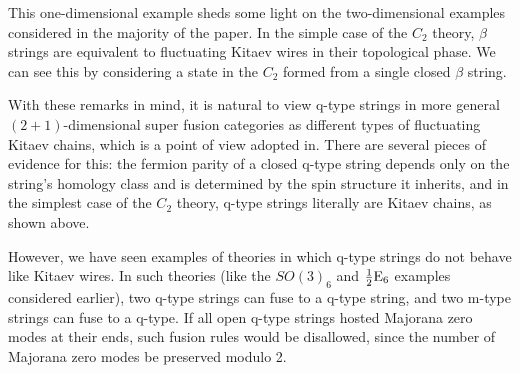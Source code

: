 This one-dimensional example sheds some light on the two-dimensional examples 
considered in the majority of the paper. In the simple case of the $C_2$ theory, 
$\beta$ strings are equivalent to fluctuating Kitaev wires in their topological phase. 
We can see this by considering a state in the $C_2$ formed from a single closed $\beta$ string.



With these remarks in mind, it 
is natural to view q-type strings in more general $(2+1)$-dimensional super fusion categories 
as different types of fluctuating Kitaev chains, which is a point of view adopted in\cite{tarantino2016,ware2016,kapustin2017}. 
There are several pieces of evidence for this: the fermion parity of a closed q-type string 
depends only on the string's homology class and is determined by the spin structure it inherits, 
and in the simplest case of the $C_2$ theory, q-type strings literally are Kitaev chains, as shown 
above. 

However, we have seen examples of theories in which q-type strings do not behave like Kitaev wires.
In such theories (like the $SO(3)_6$ and $\frac{1}{2}\text{E}_6$ examples considered earlier), two q-type
strings can fuse to a q-type string, and two m-type strings can fuse to a q-type. 
If all open q-type strings hosted Majorana zero modes at their ends, such fusion rules would 
be disallowed, since the number of Majorana zero modes be preserved modulo 2. 






 
 